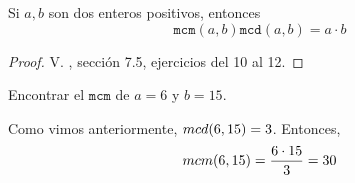 	\begin{prop}
		\label{prop:mcm}
		Si $a,b$ son dos enteros positivos, entonces
		$$
		\texttt{mcm}(a,b)\texttt{mcd}(a,b)= a\cdot b
		$$
	\end{prop}
	\begin{proof}
		V. \cite{cardenas1973algebra}, sección 7.5, ejercicios del 10 al 12. 
	\end{proof}
	\begin{problema}
		\label{exmp:mcm}
		Encontrar el $\texttt{mcm}$ de $a=6$ y $b=15.$
	\end{problema}
	\begin{sol}
		Como vimos anteriormente, $ mcd(6,15)=3 $. Entonces, 
		\[ mcm(6,15)=\dfrac{6\cdot15}{3}= 30 \]
	\end{sol}

